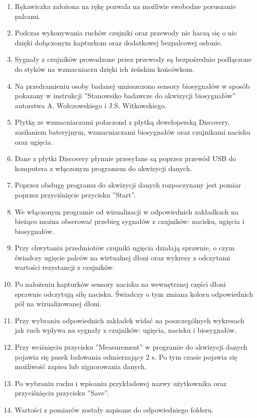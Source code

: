 \documentclass{article}
\begin{document}
\begin{enumerate}
  \item Rękawiczka założona na rękę pozwala na możliwie swobodne poruszanie palcami.
	\item Podczas wykonywania ruchów czujniki oraz przewody nie haczą się o nic dzięki dołączonym kapturkom oraz dodatkowej bezpalcowej osłonie.
	\item Sygnały z czujników prowadzone przez przewody są bezpośrednio podłączone do styków na wzmacniaczu dzięki ich żeńskim końcówkom.
	\item Na przedramieniu osoby badanej umieszczono sensory biosygnałów w sposób pokazany w instrukcji ''Stanowsiko badawcze do akwizycji biosygnałów'' autorstwa A. Wołczowskiego i J.S. Witkowskiego.
	\item Płytkę ze wzmacniaczami połaczond z płytką deweloperską Discovery, zasilaniem bateryjnym, wzmacniaczami biosygnałów oraz czujnikami nacisku oraz ugięcia.
	\item Dane z płytki Discovery płynnie przesyłane są poprzez przewód USB do komputera z włączonym programem do akwizycji danych.
	\item Poprzez obsługę programu do akwizycji danych rozpoczynany jest pomiar poprzez przyciśnięcie przycisku ''Start''.
	\item We włączonym programie od wizualizacji w odpowiednich zakładkach na bieżąco można obserować przebieg sygnałów z czujników: nacisku, ugięcia i biosygnałów.
	\item Przy chwytaniu przedmiotów czujniki ugięcia działają sprawnie, o czym świadczy ugięcie palców na wirtualnej dłoni oraz wykresy z odczytami wartości rezystancji z czujników.
	\item Po nałożeniu kapturków sensory nacisku na wewnętrznej części dłoni sprawnie odczytują siłę nacisku. Świadczy o tym zmiana koloru odpowiednich pól na wizualizowanej dłoni.
	\item Przy wybraniu odpowiednich zakładek widać na poszczególnych wykresach jak ruch wpływa na sygnały z czujników: ugięcia, nacisku i biosygnałów.
	\item Przy wciśnięciu przycisku ''Measurement'' w programie do akwizycji danych pojawia się pasek ładowania odmierzający 2 s. Po tym czasie pojawia się możliwość zapisu lub zignorowania danych.
	\item Po wybraniu ruchu i wpisaniu przykładowej nazwy użytkownika oraz przyciśnięciu przycisku ''Save''.
	\item Wartości z pomiarów zostały zapisane do odpowiedniego folderu.	
\end{enumerate}
\end{document}
